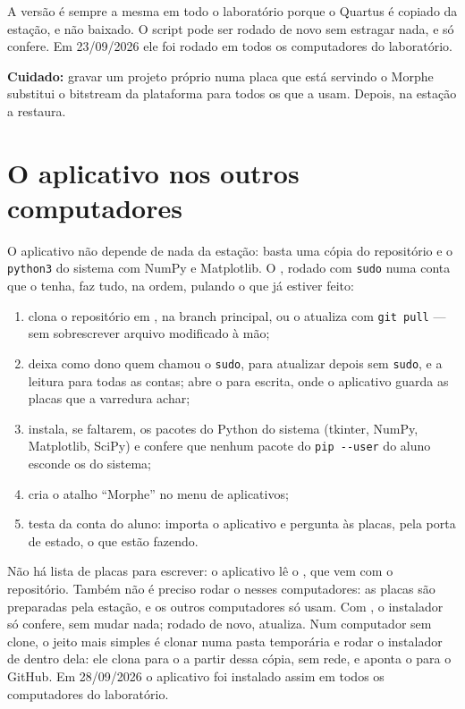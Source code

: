 A versão é sempre a mesma em todo o laboratório porque o Quartus é copiado da
estação, e não baixado. O script pode ser rodado de novo sem estragar nada, e
 só confere. Em 23/09/2026 ele foi rodado em todos os
computadores do laboratório.

\textbf{Cuidado:} gravar um projeto próprio numa placa que está servindo o
Morphe substitui o bitstream da plataforma para todos os que a usam. Depois,
 na estação a restaura.

\section{O aplicativo nos outros computadores}

O aplicativo não depende de nada da estação: basta uma cópia do repositório e o
\texttt{python3} do sistema com NumPy e Matplotlib. O
, rodado com \texttt{sudo} numa conta que o tenha, faz
tudo, na ordem, pulando o que já estiver feito:

\begin{enumerate}
  \item clona o repositório em , na branch principal, ou o
    atualiza com \texttt{git pull} --- sem sobrescrever arquivo modificado à mão;
  \item deixa como dono quem chamou o \texttt{sudo}, para atualizar depois sem
    \texttt{sudo}, e a leitura para todas as contas; abre o
     para escrita, onde o aplicativo guarda as placas que a
    varredura achar;
  \item instala, se faltarem, os pacotes do Python do sistema (tkinter, NumPy,
    Matplotlib, SciPy) e confere que nenhum pacote do \texttt{pip -{}-user} do
    aluno esconde os do sistema;
  \item cria o atalho ``Morphe'' no menu de aplicativos;
  \item testa da conta do aluno: importa o aplicativo e pergunta às placas, pela
    porta de estado, o que estão fazendo.
\end{enumerate}

Não há lista de placas para escrever: o aplicativo lê o , que
vem com o repositório. Também não é preciso rodar o  nesses
computadores: as placas são preparadas pela estação, e os outros computadores só
usam. Com , o instalador só confere, sem mudar nada; rodado de
novo, atualiza. Num computador sem clone, o jeito mais simples é clonar numa
pasta temporária e rodar o instalador de dentro dela: ele clona para o
 a partir dessa cópia, sem rede, e aponta o
 para o GitHub. Em 28/09/2026 o aplicativo foi instalado assim
em todos os computadores do laboratório.

